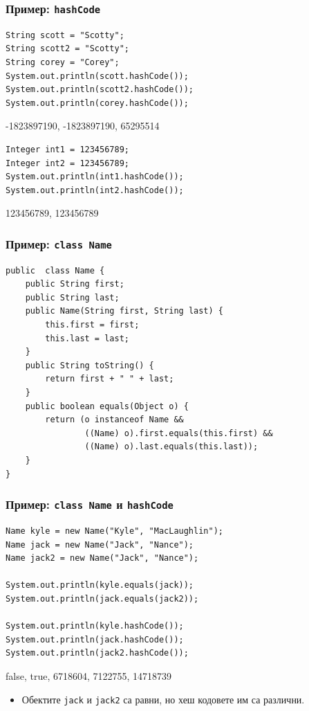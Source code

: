 \documentclass[ignorenonframetext, hyperref=unicode,compress]{beamer}
\begin{document}
\begin{frame}[containsverbatim]\frametitle{Пример: \lstinline{hashCode}}
\begin{lstlisting}
String scott = "Scotty";
String scott2 = "Scotty";
String corey = "Corey";
System.out.println(scott.hashCode());
System.out.println(scott2.hashCode());
System.out.println(corey.hashCode());
\end{lstlisting}
{\color{blue} -1823897190, -1823897190, 65295514}

\begin{lstlisting}
Integer int1 = 123456789;
Integer int2 = 123456789;
System.out.println(int1.hashCode());
System.out.println(int2.hashCode());
\end{lstlisting}
{\color{blue} 123456789, 123456789}

\end{frame}


\begin{frame}[containsverbatim]\frametitle{Пример: \lstinline{class Name}}
\begin{lstlisting}
public  class Name {
 	public String first;
 	public String last;
 	public Name(String first, String last) {
 		this.first = first;
 		this.last = last;
	}
 	public String toString() {
 		return first + " " + last;
	}
 	public boolean equals(Object o) {
 		return (o instanceof Name &&
 				((Name) o).first.equals(this.first) &&
 				((Name) o).last.equals(this.last));
	}
}
\end{lstlisting}
\end{frame}

\begin{frame}[containsverbatim]\frametitle{Пример: \lstinline{class Name} и \lstinline{hashCode}}
\begin{lstlisting}
Name kyle = new Name("Kyle", "MacLaughlin");
Name jack = new Name("Jack", "Nance");
Name jack2 = new Name("Jack", "Nance");

System.out.println(kyle.equals(jack));
System.out.println(jack.equals(jack2));

System.out.println(kyle.hashCode());
System.out.println(jack.hashCode());
System.out.println(jack2.hashCode());
\end{lstlisting}
{\color{blue} false, true, 6718604, 7122755, 14718739}
\begin{itemize}
\item Обектите \lstinline{jack} и \lstinline{jack2} са равни, но хеш кодовете им са различни.
\end{itemize}
\end{frame}
\end{document}
